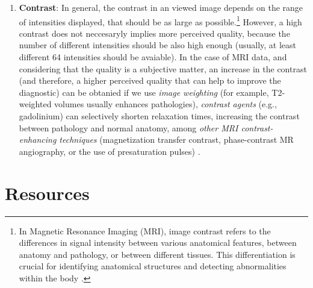 \begin{enumerate}
  mm). This characteristic depends fundamentally on the \emph{minimal
    slice-thickness} provided by the internal coil, the
  \emph{resolution of the k-space}, and on the \emph{magnetic field
    strength (B0)} to provide a high enought SNR.\footnote{The SNR
    increases with B0 and the voxel size, so, to increase the
    resolution (decrease the voxel size) we must keep high enough the
    SNR by increasing B0. Otherwise, the noise can make it difficult
    to recognize the pathology}
\item \textbf{Contrast}: In general, the contrast in an viewed image
  depends on the range of intensities displayed, that should be as
  large as possible.\footnote{In Magnetic Resonance Imaging (MRI),
    image contrast refers to the differences in signal intensity
    between various anatomical features, between anatomy and
    pathology, or between different tissues. This differentiation is
    crucial for identifying anatomical structures and detecting
    abnormalities within the body \cite{westbrook2018mri}.} However, a
  high contrast does not neccesaryly implies more perceived quality,
  because the number of different intensities should be also high
  enough (usually, at least different 64 intensities should be
  avaiable). In the case of MRI data, and considering that the quality
  is a subjective matter, an increase in the contrast (and therefore,
  a higher perceived quality that can help to improve the diagnostic)
  can be obtanied if we use \emph{image weighting} (for example,
  T2-weighted volumes usually enhances pathologies), \emph{contrast agents}
  (e.g., gadolinium) can selectively shorten relaxation times,
  increasing the contrast between pathology and normal anatomy, among
  \emph{other MRI contrast-enhancing techniques} (magnetization
  transfer contrast, phase-contrast MR angiography, or the use of
  presaturation pulses) \cite{westbrook2018mri}.
\end{enumerate}

\section{Resources}


